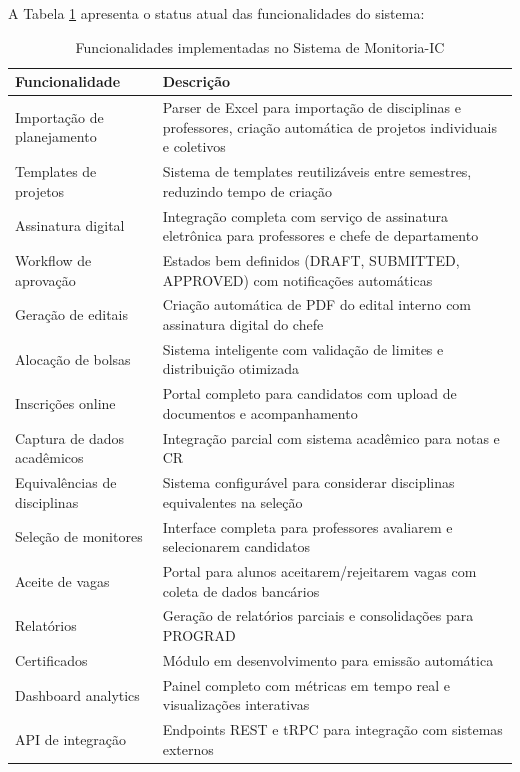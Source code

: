 \documentclass[portuguese]{sbc2025}%
\begin{document}
A Tabela \ref{tab:funcionalidades} apresenta o status atual das funcionalidades do sistema:

\begin{table}[htb]
  \centering
  \caption{Funcionalidades implementadas no Sistema de Monitoria-IC}
  \label{tab:funcionalidades}
  \begin{tabular}{|l|p{9cm}|}
    \hline
    \textbf{Funcionalidade} & \textbf{Descrição} \\
    \hline
    Importação de planejamento & Parser de Excel para importação de disciplinas e professores, criação automática de projetos individuais e coletivos \\
    \hline
    Templates de projetos & Sistema de templates reutilizáveis entre semestres, reduzindo tempo de criação \\
    \hline
    Assinatura digital & Integração completa com serviço de assinatura eletrônica para professores e chefe de departamento \\
    \hline
    Workflow de aprovação & Estados bem definidos (DRAFT, SUBMITTED, APPROVED) com notificações automáticas \\
    \hline
    Geração de editais & Criação automática de PDF do edital interno com assinatura digital do chefe \\
    \hline
    Alocação de bolsas & Sistema inteligente com validação de limites e distribuição otimizada \\
    \hline
    Inscrições online & Portal completo para candidatos com upload de documentos e acompanhamento \\
    \hline
    Captura de dados acadêmicos & Integração parcial com sistema acadêmico para notas e CR \\
    \hline
    Equivalências de disciplinas & Sistema configurável para considerar disciplinas equivalentes na seleção \\
    \hline
    Seleção de monitores & Interface completa para professores avaliarem e selecionarem candidatos \\
    \hline
    Aceite de vagas & Portal para alunos aceitarem/rejeitarem vagas com coleta de dados bancários \\
    \hline
    Relatórios & Geração de relatórios parciais e consolidações para PROGRAD \\
    \hline
    Certificados & Módulo em desenvolvimento para emissão automática \\
    \hline
    Dashboard analytics & Painel completo com métricas em tempo real e visualizações interativas \\
    \hline
    API de integração & Endpoints REST e tRPC para integração com sistemas externos \\
    \hline
  \end{tabular}
\end{table}
\end{document}
